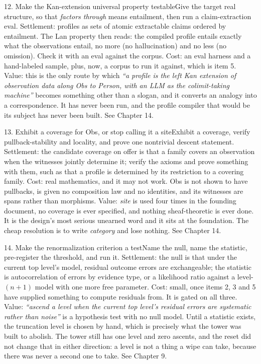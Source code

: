 \begin{Open}{12. Make the Kan-extension universal property testable}{Give the target real structure, so that \textit{factors through} means entailment, then run a claim-extraction eval.}
Settlement: profiles as sets of atomic extractable claims ordered by entailment. The Lan property then reads: the compiled profile entails exactly what the observations entail, no more (no hallucination) and no less (no omission). Check it with an eval against the corpus. Cost: an eval harness and a hand-labeled sample, plus, now, a corpus to run it against, which is item 5. Value: this is the only route by which \textit{``a profile is the left Kan extension of observation data along Obs to Person, with an LLM as the colimit-taking machine''} becomes something other than a slogan, and it converts an analogy into a correspondence. It has never been run, and the profile compiler that would be its subject has never been built. See Chapter 14.
\end{Open}

\begin{Open}{13. Exhibit a coverage for Obs, or stop calling it a site}{Exhibit a coverage, verify pullback-stability and locality, and prove one nontrivial descent statement.}
Settlement: the candidate coverage on offer is that a family covers an observation when the witnesses jointly determine it; verify the axioms and prove something with them, such as that a profile is determined by its restriction to a covering family. Cost: real mathematics, and it may not work. Obs is not shown to have pullbacks, is given no composition law and no identities, and its witnesses are spans rather than morphisms. Value: \textit{site} is used four times in the founding document, no coverage is ever specified, and nothing sheaf-theoretic is ever done. It is the design's most serious unearned word and it sits at the foundation. The cheap resolution is to write \textit{category} and lose nothing. See Chapter 14.
\end{Open}

\begin{Open}{14. Make the renormalization criterion a test}{Name the null, name the statistic, pre-register the threshold, and run it.}
Settlement: the null is that under the current top level's model, residual outcome errors are exchangeable; the statistic is autocorrelation of errors by evidence type, or a likelihood ratio against a level-$(n+1)$ model with one more free parameter. Cost: small, once items 2, 3 and 5 have supplied something to compute residuals from. It is gated on all three. Value: \textit{``ascend a level when the current top level's residual errors are systematic rather than noise''} is a hypothesis test with no null model. Until a statistic exists, the truncation level is chosen by hand, which is precisely what the tower was built to abolish. The tower still has one level and zero ascents, and the reset did not change that in either direction: a level is not a thing a wipe can take, because there was never a second one to take. See Chapter 9.
\end{Open}

